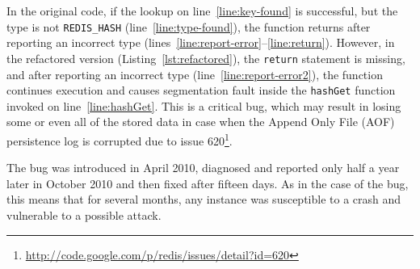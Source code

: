 In the original code, if the lookup on line~\ref{line:key-found} is successful,
but the type is not \lstinline`REDIS_HASH` (line~\ref{line:type-found}), the
function returns after reporting an incorrect type
(lines~\ref{line:report-error}--\ref{line:return}). However, in the refactored
version (Listing~\ref{lst:refactored}), the \lstinline`return` statement is
missing, and after reporting an incorrect type (line~\ref{line:report-error2}),
the function continues execution and causes segmentation fault inside the
\lstinline`hashGet` function invoked on line~\ref{line:hashGet}. This is a
critical bug, which may result in losing some or even all of the stored data in
case when the Append Only File (AOF) persistence log is corrupted due to issue
620\footnote{\url{http://code.google.com/p/redis/issues/detail?id=620}}.

The bug was introduced in April 2010, diagnosed and reported only half a year
later in October 2010 and then fixed after fifteen days.  As in the case of the
\lighttpd bug, this means that for several months, any \redis instance was
susceptible to a crash and vulnerable to a possible attack.
